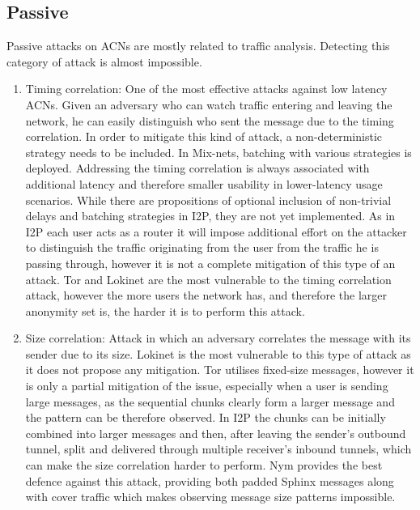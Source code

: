 \subsection{Passive}
Passive attacks on ACNs are mostly related to traffic analysis. Detecting this category of attack is almost impossible.
\begin{enumerate}
    \item Timing correlation: One of the most effective attacks against low latency ACNs. Given an adversary who can watch traffic entering and leaving the network, he can easily distinguish who sent the message due to the timing correlation. In order to mitigate this kind of attack, a non-deterministic strategy needs to be included. In Mix-nets, batching with various strategies is deployed. Addressing the timing correlation is always associated with additional latency and therefore smaller usability in lower-latency usage scenarios. While there are propositions of optional inclusion of non-trivial delays and batching strategies in I2P, they are not yet implemented. As in I2P each user acts as a router it will impose additional effort on the attacker to distinguish the traffic originating from the user from the traffic he is passing through, however it is not a complete mitigation of this type of an attack. Tor and Lokinet are the most vulnerable to the timing correlation attack, however the more users the network has, and therefore the larger anonymity set is, the harder it is to perform this attack.
    \item Size correlation: Attack in which an adversary correlates the message with its sender due to its size. Lokinet is the most vulnerable to this type of attack as it does not propose any mitigation. Tor utilises fixed-size messages, however it is only a partial mitigation of the issue, especially when a user is sending large messages, as the sequential chunks clearly form a larger message and the pattern can be therefore observed. In I2P the chunks can be initially combined into larger messages and then, after leaving the sender’s outbound tunnel, split and delivered through multiple receiver’s inbound tunnels, which can make the size correlation harder to perform. Nym provides the best defence against this attack, providing both padded Sphinx messages along with cover traffic which makes observing message size patterns impossible.

\end{enumerate}
